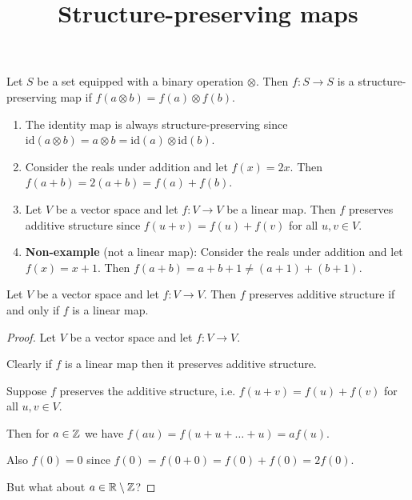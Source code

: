 \documentclass[12pt]{article}
\title{Structure-preserving maps}
\date{}
\newcommand{\op}{\otimes}
\newcommand{\id}{\text{id}}
\begin{document}
\maketitle

\begin{definition*}
  Let $S$ be a set equipped with a binary operation $\op$. Then $f:S \to S$ is a
  structure-preserving map if $f(a \op b) = f(a) \op f(b)$.
\end{definition*}

\begin{examples*}\hspace{0pt}
  \begin{enumerate}

  \item The identity map is always structure-preserving since
    $\id(a \op b) = a \op b = \id(a) \op \id(b)$.

  \item Consider the reals under addition and let $f(x) = 2x$. Then
    $f(a + b) = 2(a + b) = f(a) + f(b)$.

  \item Let $V$ be a vector space and let $f:V \to V$ be a linear map. Then $f$ preserves additive
    structure since $f(u + v) = f(u) + f(v)$ for all $u, v \in V$.

  \item {\bf Non-example} (not a linear map): Consider the reals under addition and let $f(x) = x + 1$. Then $f(a + b) = a + b + 1 \neq (a + 1) + (b + 1)$.

  \end{enumerate}
\end{examples*}

\begin{claim*}
  Let $V$ be a vector space and let $f: V \to V$. Then $f$ preserves additive structure if and only
  if $f$ is a linear map.
\end{claim*}

\begin{proof}
  Let $V$ be a vector space and let $f:V \to V$.

  Clearly if $f$ is a linear map then it preserves additive structure.


  Suppose $f$ preserves the additive structure, i.e.  $f(u + v) = f(u) + f(v)$ for all
  $u, v \in V$.

  Then for $a \in \mathbb{Z}$ we have $f(au) = f(u + u + \ldots + u) = af(u)$.

  Also $f(0) = 0$ since $f(0) = f(0 + 0) = f(0) + f(0) = 2f(0)$.

  But what about $a \in \mathbb{R} \setminus \mathbb{Z}$?
\end{proof}
\end{document}
